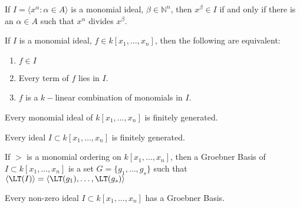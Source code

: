 \documentclass[crop=false,class=article,oneside]{standalone}
\begin{document}
    \begin{theorem}
    If $I = \langle x^\alpha: \alpha \in A\rangle$ is a monomial ideal, $\beta \in \mathbb{N}^n$, then $x^\beta \in I$ if and only if there is an $\alpha \in A$ such that $x^\alpha$ divides $x^\beta$.
    \end{theorem}
    \begin{theorem}
    If $I$ is a monomial ideal, $f\in k[x_1,\hdots ,x_n]$, then the following are equivalent:
    \begin{enumerate}
        \item $f\in I$
        \item Every term of $f$ lies in $I$.
        \item $f$ is a $k-$linear combination of monomials in $I$.
    \end{enumerate}
    \end{theorem}
    \begin{theorem}
    Every monomial ideal of $k[x_1,\hdots ,x_n]$ is finitely generated.
    \end{theorem}
    \begin{theorem}
    Every ideal $I\subset k[x_1,\hdots ,x_n]$ is finitely generated.
    \end{theorem}
    \begin{definition}
    If $>$ is a monomial ordering on $k[x_1,\hdots ,x_n]$, then a Groebner Basis of $I\subset k[x_1,\hdots ,x_n]$ is a set $G = \{g_1,\hdots, g_s\}$ such that $\langle \LT(I)\rangle = \langle \LT(g_1),\hdots, \LT(g_s)\rangle$
    \end{definition}
    \begin{theorem}
    Every non-zero ideal $I\subset k[x_1,\hdots ,x_n]$ has a Groebner Basis.
    \end{theorem}
\end{document}
